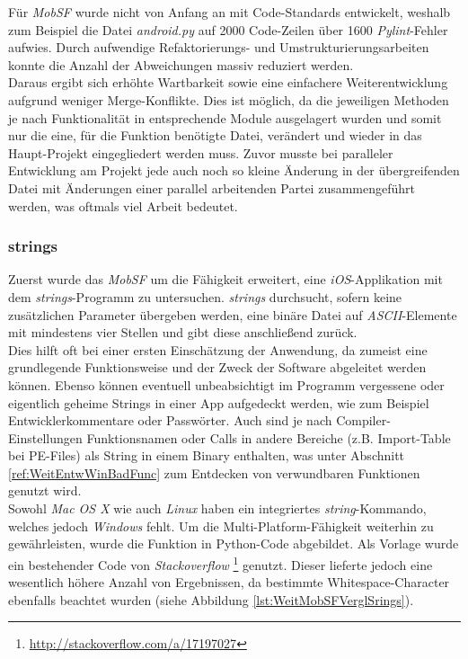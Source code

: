 Für \textit{MobSF} wurde nicht von Anfang an mit Code-Standards entwickelt, weshalb zum Beispiel die Datei \textit{android.py} auf 2000 Code-Zeilen über 1600 \textit{Pylint}-Fehler aufwies. Durch aufwendige Refaktorierungs- und Umstrukturierungsarbeiten konnte die Anzahl der Abweichungen massiv reduziert werden.\\

Daraus ergibt sich erhöhte Wartbarkeit sowie eine einfachere Weiterentwicklung aufgrund weniger Merge-Konflikte. Dies ist möglich, da die jeweiligen Methoden je nach Funktionalität in entsprechende Module ausgelagert wurden und somit nur die eine, für die Funktion benötigte Datei, verändert und wieder in das Haupt-Projekt eingegliedert werden muss. Zuvor musste bei paralleler Entwicklung am Projekt jede auch noch so kleine Änderung in der übergreifenden Datei mit Änderungen einer parallel arbeitenden Partei zusammengeführt werden, was oftmals viel Arbeit bedeutet.

\subsubsection{strings}\label{ref:strings}
Zuerst wurde das \textit{MobSF} um die Fähigkeit erweitert, eine \textit{iOS}-Applikation mit dem \textit{strings}-Programm zu untersuchen. \textit{strings} durchsucht, sofern keine zusätzlichen Parameter übergeben werden, eine binäre Datei auf \textit{ASCII}-Elemente mit mindestens vier Stellen und gibt diese anschließend zurück.\\

Dies hilft oft bei einer ersten Einschätzung der Anwendung, da zumeist eine grundlegende Funktionsweise und der Zweck der Software abgeleitet werden können. Ebenso können eventuell unbeabsichtigt im Programm vergessene oder eigentlich geheime Strings in einer App aufgedeckt werden, wie zum Beispiel Entwicklerkommentare oder Passwörter. Auch sind je nach Compiler-Einstellungen Funktionsnamen oder Calls in andere Bereiche (z.B. Import-Table bei PE-Files) als String in einem Binary enthalten, was unter Abschnitt \ref{ref:WeitEntwWinBadFunc} zum Entdecken von verwundbaren Funktionen genutzt wird.\\

Sowohl \textit{Mac OS X} wie auch \textit{Linux} haben ein integriertes \textit{string}-Kommando, welches jedoch \textit{Windows} fehlt. Um die Multi-Platform-Fähigkeit weiterhin zu gewährleisten, wurde die Funktion in Python-Code abgebildet. Als Vorlage wurde ein bestehender Code von \textit{Stackoverflow} \footnote{\url{http://stackoverflow.com/a/17197027}} genutzt. Dieser lieferte jedoch eine wesentlich höhere Anzahl von Ergebnissen, da bestimmte Whitespace-Character ebenfalls beachtet wurden (siehe Abbildung \ref{lst:WeitMobSFVerglSrings}).\\

